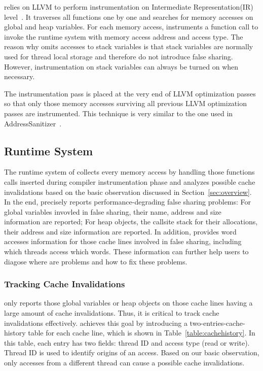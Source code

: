 \Predator{} relies on LLVM to perform instrumentation on Intermediate Representation(IR) level~\cite{llvm}.
It traverses all functions one by one and 
searches for memory accesses on global and heap variables. 
For each memory access, \Predator{} instruments a function call to 
invoke the runtime system with memory access address and access type.
The reason why \Predator{} omits accesses to stack variables 
is that stack variables are normally used for thread local storage and
therefore do not introduce false sharing. However, instrumentation on stack
variables can always be turned on when necessary. 

The instrumentation pass is placed at the very end of LLVM optimization passes 
so that only those memory accesses surviving all previous 
LLVM optimization passes are instrumented. 
This  technique is very similar to the one used in AddressSanitizer~\cite{Addresssanitizer}.

\subsection{Runtime System}
\label{sec:runtime}
The runtime system of \Predator{} collects every memory access by handling 
those functions calls inserted during compiler instrumentation phase and analyzes
possible cache invalidations based on the basic observation discussed in Section~\ref{sec:overview}.
In the end, \Predator{} precisely reports performance-degrading false sharing problems:
For global variables invovled in false sharing, their name, address and size
information are reported; For heap objects, the callsite stack for their allocations, 
their address and size information are reported.
In addition, \Predator{} provides word accesses information for those cache lines 
involved in false sharing, including which threads access which words. 
These information can further help 
users to diagose where are problems and how to fix these problems.

\subsubsection{Tracking Cache Invalidations}
\Predator{} only reports those global variables or heap objects on 
those cache lines having a large amount of cache invalidations. 
Thus, it is critical to track cache invalidations effectively. 
\Predator{} achieves this goal by introducing a  
two-entries-cache-history table for each cache line, which is 
shown in Table~\ref{table:cachehistory}. 
In this table, each entry has two fields: thread ID and access type (read or write).
Thread ID is used to identify origins of an access. Based on our basic observation,
only accesses from a different thread can cause a possible cache invalidations. 

